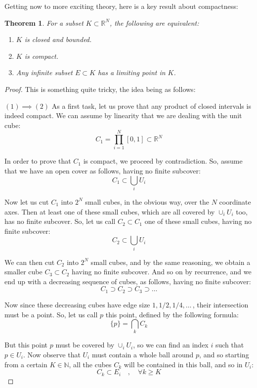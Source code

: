 \documentclass[12pt]{amsbook}
\newtheorem{theorem}{Theorem}[chapter]
\begin{document}
Getting now to more exciting theory, here is a key result about compactness:


\begin{theorem}
For a subset $K\subset\mathbb R^N$, the following are equivalent:
\begin{enumerate}
\item $K$ is closed and bounded.

\item $K$ is compact.

\item Any infinite subset $E\subset K$ has a limiting point in $K$.
\end{enumerate}
\end{theorem}

\begin{proof}
This is something quite tricky, the idea being as follows:

\medskip

$(1)\implies(2)$ As a first task, let us prove that any product of closed intervals is indeed compact. We can assume by linearity that we are dealing with the unit cube:
$$C_1=\prod_{i=1}^N[0,1]\subset\mathbb R^N$$

In order to prove that $C_1$ is compact, we proceed by contradiction. So, assume that we have an open cover as follows, having no finite subcover:
$$C_1\subset\bigcup_iU_i$$

Now let us cut $C_1$ into $2^N$ small cubes, in the obvious way, over the $N$ coordinate axes. Then at least one of these small cubes, which are all covered by $\cup_iU_i$ too, has no finite subcover. So, let us call $C_2\subset C_1$ one of these small cubes, having no finite subcover:
$$C_2\subset\bigcup_iU_i$$

We can then cut $C_2$ into $2^N$ small cubes, and by the same reasoning, we obtain a smaller cube $C_3\subset C_2$ having no finite subcover. And so on by recurrence, and we end up with a decreasing sequence of cubes, as follows, having no finite subcover:
$$C_1\supset C_2\supset C_3\supset\ldots$$

Now since these decreasing cubes have edge size $1,1/2,1/4,\ldots\,$, their intersection must be a point. So, let us call $p$ this point, defined by the following formula:
$$\{p\}=\bigcap_kC_k$$

But this point $p$ must be covered by $\cup_iU_i$, so we can find an index $i$ such that $p\in U_i$. Now observe that $U_i$ must contain a whole ball around $p$, and so starting from a certain $K\in\mathbb N$, all the cubes $C_k$ will be contained in this ball, and so in $U_i$:
$$C_k\subset E_i\quad,\quad\forall k\geq K$$


\end{proof}
\end{document}
